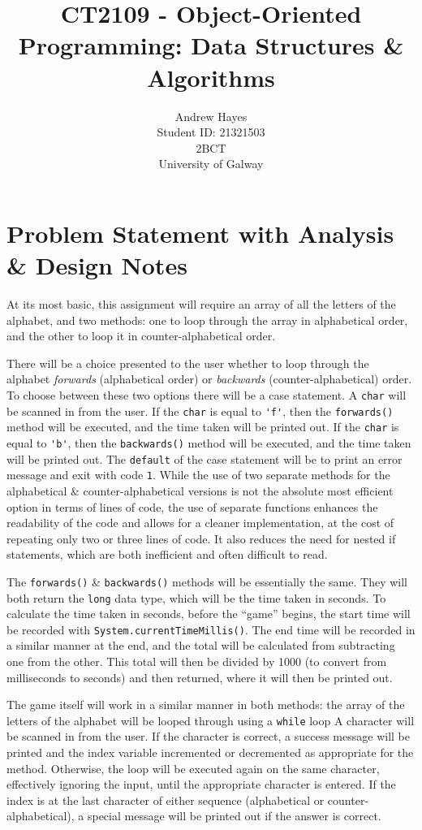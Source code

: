 \documentclass[11pt]{article}
\title{CT2109 - Object-Oriented Programming: Data Structures \& Algorithms}
\author{Andrew Hayes\\
\AND
\AND
\AND
\AND
    Student ID: 21321503 \\
\AND
	2BCT\\
\AND
    University of Galway\\
}
\begin{document}
\maketitle

\newpage
\setcounter{page}{1}
\section{Problem Statement with Analysis \& Design Notes}
At its most basic, this assignment will require an array of all the letters of the alphabet, and two methods: 
one to loop through the array in alphabetical order, and the other to loop it in counter-alphabetical order.

There will be a choice presented to the user whether to loop through the alphabet \textit{forwards} (alphabetical order) 
or \textit{backwards} (counter-alphabetical) order. 
To choose between these two options there will be a case statement. 
A \verb|char| will be scanned in from the user. 
If the \verb|char| is equal to \verb|'f'|, then the \verb|forwards()| method will be executed, and the time taken will be printed out. 
If the \verb|char| is equal to \verb|'b'|, then the \verb|backwards()| method will be executed, and the time taken will be printed out. 
The \verb|default| of the case statement will be to print an error message and exit with code \verb|1|. 
While the use of two separate methods for the alphabetical \& counter-alphabetical versions is not the absolute most efficient option in terms of lines of code, 
the use of separate functions enhances the readability of the code and allows for a cleaner implementation, at the cost of repeating only two or three lines of code. 
It also reduces the need for nested if statements, which are both inefficient and often difficult to read. 

The \verb|forwards()| \& \verb|backwards()| methods will be essentially the same. 
They will both return the \verb|long| data type, which will be the time taken in seconds. 
To calculate the time taken in seconds, before the ``game'' begins, the start time will be recorded with \verb|System.currentTimeMillis()|. 
The end time will be recorded in a similar manner at the end, and the total will be calculated from subtracting one from the other. 
This total will then be divided by 1000 (to convert from milliseconds to seconds) and then returned, where it will then be printed out. 

The game itself will work in a similar manner in both methods: the array of the letters of the alphabet will be looped through using a \verb|while| loop 
A character will be scanned in from the user. 
If the character is correct, a success message will be printed and the index variable incremented or decremented as appropriate for the method. 
Otherwise, the loop will be executed again on the same character, effectively ignoring the input, until the appropriate character is entered. 
If the index is at the last character of either sequence (alphabetical or counter-alphabetical), a special message will be printed out if the answer is correct. 
\end{document}
